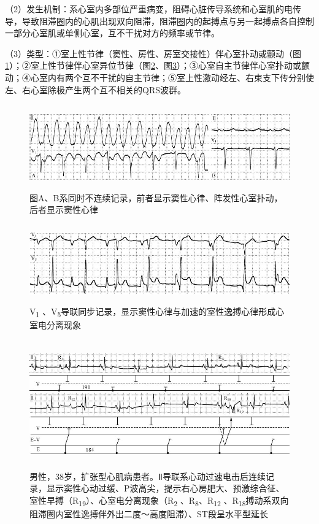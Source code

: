 （2）发生机制：系心室内多部位严重病变，阻碍心脏传导系统和心室肌的电传导，导致阻滞圈内的心肌出现双向阻滞，阻滞圈内的起搏点与另一起搏点各自控制一部分心室肌或单侧心室，互不干扰对方的频率或节律。

（3）类型：①室上性节律（窦性、房性、房室交接性）伴心室扑动或颤动（图\ref{fig30-5}）；②室上性节律伴心室异位节律（图\ref{fig30-6}、图\ref{fig30-7}）；③心室自主节律伴心室扑动或颤动；④心室内有两个互不干扰的自主节律；⑤室上性激动经左、右束支下传分别使左、右心室除极产生两个互不相关的QRS波群。

\begin{figure}[!htbp]
 \centering
 \includegraphics[width=5.60417in,height=1.4375in]{./images/Image00500.jpg}
 \captionsetup{justification=centering}
 \caption{图A、B系同时不连续记录，前者显示窦性心律、阵发性心室扑动，后者显示窦性心律}
 \label{fig30-5}
  \end{figure} 

\begin{figure}[!htbp]
 \centering
 \includegraphics[width=5.59375in,height=1.32292in]{./images/Image00501.jpg}
 \captionsetup{justification=centering}
 \caption{V\textsubscript{1} 、V\textsubscript{5}导联同步记录，显示窦性心律与加速的室性逸搏心律形成心室电分离现象}
 \label{fig30-6}
  \end{figure} 


\begin{figure}[!htbp]
 \centering
 \includegraphics[width=5.58333in,height=2.17708in]{./images/Image00502.jpg}
 \captionsetup{justification=centering}
 \caption{男性，38岁，扩张型心肌病患者。Ⅱ导联系心动过速电击后连续记录，显示窦性心动过缓、P波高尖，提示右心房肥大、预激综合征、室性早搏（R\textsubscript{19}）、心室电分离现象（R\textsubscript{2} 、R\textsubscript{8}、R\textsubscript{12} 、R\textsubscript{18}搏动系双向阻滞圈内室性逸搏伴外出二度～高度阻滞）、ST段呈水平型延长}
 \label{fig30-7}
  \end{figure} 


